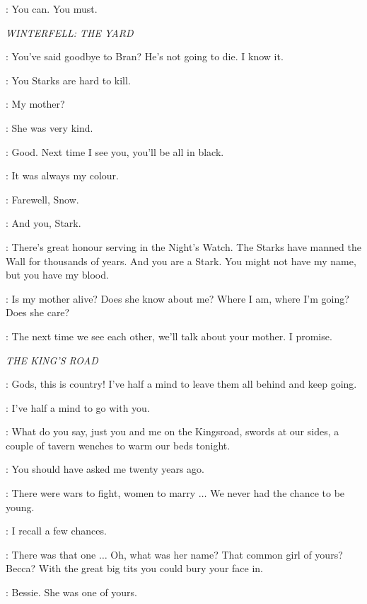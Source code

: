 \NED: You can. You must. 

\scene

\textit{WINTERFELL: THE YARD}


\ROBB: You've said goodbye to Bran? He's not going to die. I know it. 

\JON: You Starks are hard to kill. 

\ROBB: My mother? 

\JON: She was very kind. 

\ROBB: Good. Next time I see you, you'll be all in black. 

\JON: It was always my colour. 

\ROBB: Farewell, Snow. 

\JON: And you, Stark. 


\NED: There's great honour serving in the Night's Watch. The Starks have manned the Wall for thousands of years. And you are a Stark. You might not have my name, but you have my blood. 

\JON: Is my mother alive? Does she know about me? Where I am, where I'm going? Does she care? 

\NED: The next time we see each other, we'll talk about your mother. I promise. 

\scene

\textit{THE KING'S ROAD}


\ROBERT: Gods, this is country! I've half a mind to leave them all behind and keep going. 

\NED: I've half a mind to go with you. 

\ROBERT: What do you say, just you and me on the Kingsroad, swords at our sides, a couple of tavern wenches to warm our beds tonight. 

\NED: You should have asked me twenty years ago. 

\ROBERT: There were wars to fight, women to marry $\ldots$ We never had the chance to be young. 

\NED: I recall a few chances. 

\ROBERT: There was that one $\ldots$ Oh, what was her name? That common girl of yours? Becca? With the great big tits you could bury your face in. 

\NED: Bessie. She was one of yours. 

